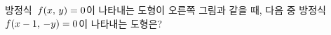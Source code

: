 \noindent\begin{minipage}[t]{0.58\linewidth}\vspace{0pt}\raggedright 방정식~$f(x,\mkern3mu y)=0$이 나타내는 도형이 오른쪽 그림과 같을 때, 다음 중 방정식~$f(x-1,\mkern3mu -y)=0$이 나타내는 도형은?\end{minipage}\hfill\begin{minipage}[t]{0.4\linewidth}\vspace{0pt}\centering \resizebox{\ifdim\width>\linewidth\linewidth\else\width\fi}{!}{}\end{minipage}\par
\begin{choicesii}{}{}{}{}{}\end{choicesii}

